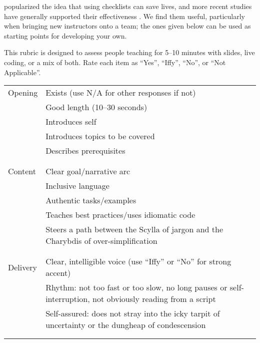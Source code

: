 
\cite{Gawa2007} popularized the idea that using checklists can save lives,
and more recent studies have generally supported their effectiveness \cite{Avel2013,Urba2014,Rams2019}.
We find them useful,
particularly when bringing new instructors onto a team;
the ones given below can be used as starting points for developing your own.


This rubric is designed to assess people teaching for 5--10 minutes
with slides, live coding, or a mix of both.
Rate each item as ``Yes'', ``Iffy'', ``No'', or ``Not Applicable''.

\noindent
\begin{longtable}{p{}p{}}

  Opening
  & Exists (use N/A for other responses if not) \\
  & Good length (10--30 seconds) \\
  & Introduces self \\
  & Introduces topics to be covered \\
  & Describes prerequisites \\
  \\ [-1.5ex] \hline \\ [-1.5ex]

  Content
  & Clear goal/narrative arc \\
  & Inclusive language \\
  & Authentic tasks/examples \\
  & Teaches best practices/uses idiomatic code \\
  & Steers a path between the Scylla of jargon and the Charybdis of over-simplification \\
  \\ [-1.5ex] \hline \\ [-1.5ex]

  Delivery
  & Clear, intelligible voice (use ``Iffy'' or ``No'' for strong accent) \\
  & Rhythm: not too fast or too slow, no long pauses or self-interruption, not obviously reading from a script \\
  & Self-assured: does not stray into the icky tarpit of uncertainty or the dungheap of condescension \\
  \\ [-1.5ex] \hline \\ [-1.5ex]


\end{longtable}
